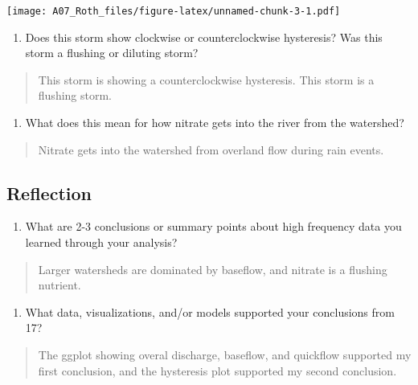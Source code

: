 \documentclass[]{article}
\providecommand{\tightlist}{%
  \setlength{\itemsep}{0pt}\setlength{\parskip}{0pt}}
\begin{document}
\texttt{[image: A07\_Roth\_files/figure-latex/unnamed-chunk-3-1.pdf]}

\begin{enumerate}
\def\labelenumi{\arabic{enumi}.}
\setcounter{enumi}{14}
\tightlist
\item
  Does this storm show clockwise or counterclockwise hysteresis? Was
  this storm a flushing or diluting storm?
\end{enumerate}

\begin{quote}
This storm is showing a counterclockwise hysteresis. This storm is a
flushing storm.
\end{quote}

\begin{enumerate}
\def\labelenumi{\arabic{enumi}.}
\setcounter{enumi}{15}
\tightlist
\item
  What does this mean for how nitrate gets into the river from the
  watershed?
\end{enumerate}

\begin{quote}
Nitrate gets into the watershed from overland flow during rain events.
\end{quote}

\hypertarget{reflection}{%
\subsection{Reflection}\label{reflection}}

\begin{enumerate}
\def\labelenumi{\arabic{enumi}.}
\setcounter{enumi}{16}
\tightlist
\item
  What are 2-3 conclusions or summary points about high frequency data
  you learned through your analysis?
\end{enumerate}

\begin{quote}
Larger watersheds are dominated by baseflow, and nitrate is a flushing
nutrient.
\end{quote}

\begin{enumerate}
\def\labelenumi{\arabic{enumi}.}
\setcounter{enumi}{17}
\tightlist
\item
  What data, visualizations, and/or models supported your conclusions
  from 17?
\end{enumerate}

\begin{quote}
The ggplot showing overal discharge, baseflow, and quickflow supported
my first conclusion, and the hysteresis plot supported my second
conclusion.
\end{quote}
\end{document}
